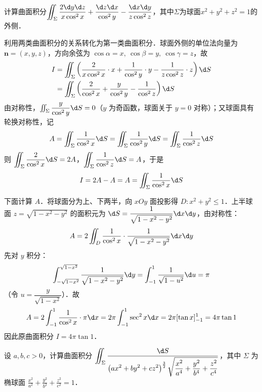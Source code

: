 \documentclass[12pt, a4paper, oneside, UTF8]{ctexbook}
\begin{document}
\begin{exercise}
    计算曲面积分$\displaystyle\iint_\Sigma \frac{2\d y\d z}{x\cos^2x}+\frac{\d z\d x}{\cos^2y}-\frac{\d x\d y}{z\cos^2z}$，其中$\Sigma$为球面$x^2+y^2+z^2=1$的外侧．
\end{exercise}
\begin{solution}
    利用两类曲面积分的关系转化为第一类曲面积分．球面外侧的单位法向量为 $\bm{n} = (x,y,z)$，方向余弦为 $\cos\alpha = x,\ \cos\beta = y,\ \cos\gamma = z$，故
    \begin{align*}
        I &= \iint_\Sigma \left( \frac{2}{x\cos^2x}\cdot x + \frac{1}{\cos^2y}\cdot y - \frac{1}{z\cos^2z}\cdot z \right) \d S \\
        &= \iint_\Sigma \left( \frac{2}{\cos^2x} + \frac{y}{\cos^2y} - \frac{1}{\cos^2z} \right) \d S
    \end{align*}
    由对称性，$\iint_\Sigma \dfrac{y}{\cos^2y} \d S = 0$（$y$ 为奇函数，球面关于 $y=0$ 对称）；又球面具有轮换对称性，记
    \[ A = \iint_\Sigma \frac{1}{\cos^2x} \d S = \iint_\Sigma \frac{1}{\cos^2y} \d S = \iint_\Sigma \frac{1}{\cos^2z} \d S \]
    则 $\displaystyle\iint_\Sigma \frac{2}{\cos^2x} \d S = 2A$，$\displaystyle\iint_\Sigma \frac{1}{\cos^2z} \d S = A$，于是
    \[ I = 2A - A = A = \iint_\Sigma \frac{1}{\cos^2x} \d S \]
    
    下面计算 $A$．将球面分为上、下两半，向 $xOy$ 面投影得 $D: x^2+y^2 \le 1$．上半球面 $z = \sqrt{1-x^2-y^2}$ 的面积元为 $\d S = \dfrac{1}{\sqrt{1-x^2-y^2}}\d x\d y$，由对称性：
    \[ A = 2 \iint_D \frac{1}{\cos^2x} \cdot \frac{1}{\sqrt{1-x^2-y^2}} \d x\d y \]
    先对 $y$ 积分：
    \[ \int_{-\sqrt{1-x^2}}^{\sqrt{1-x^2}} \frac{1}{\sqrt{1-x^2-y^2}} \d y
        = \int_{-1}^{1} \frac{1}{\sqrt{1-u^2}} \d u = \pi \]
    （令 $u = \dfrac{y}{\sqrt{1-x^2}}$）．故
    \[ A = 2 \int_{-1}^{1} \frac{1}{\cos^2x} \cdot \pi \d x = 2\pi \int_{-1}^{1} \sec^2x \d x = 2\pi [\tan x]_{-1}^{1} = 4\pi \tan 1 \]
    因此原曲面积分 $I = \boxed{4\pi \tan 1}$．
\end{solution}
\begin{exercise}
    设 $a, b, c > 0$，计算曲面积分 $\displaystyle\iint_\Sigma \frac{\d S}{\displaystyle\left(ax^2+by^2+cz^2\right)^\frac{3}{2}\sqrt{\displaystyle\frac{x^2}{a^4}+\frac{y^2}{b^4}+\frac{z^2}{c^4}}}$，其中 $\Sigma$ 为椭球面 $\displaystyle\frac{x^2}{a^2}+\frac{y^2}{b^2}+\frac{z^2}{c^2}=1$．
\end{exercise}
\end{document}
